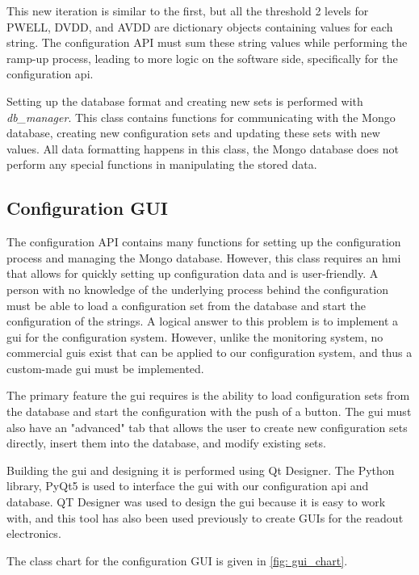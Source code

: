 \documentclass[main.tex]{subfiles}
\begin{document}
This new iteration is similar to the first, but all the threshold 2 levels for PWELL, DVDD, and AVDD are dictionary objects containing values for each string. The configuration API must sum these string values while performing the ramp-up process, leading to more logic on the software side, specifically for the configuration \gls{api}.

Setting up the database format and creating new sets is performed with  \textit{db\_manager}. This class contains functions for communicating with the Mongo database, creating new configuration sets and updating these sets with new values. All data formatting happens in this class, the Mongo database does not perform any special functions in manipulating the stored data.



\subsection{Configuration GUI}  
\label{ssec: cgui}
The configuration API contains many functions for setting up the configuration process and managing the Mongo database. However, this class requires an \gls{hmi} that allows for quickly setting up configuration data and is user-friendly. A person with no knowledge of the underlying process behind the configuration must be able to load a configuration set from the database and start the configuration of the strings. A logical answer to this problem is to implement a \gls{gui} for the configuration system. However, unlike the monitoring system, no commercial \gls{gui}s exist that can be applied to our configuration system, and thus a custom-made \gls{gui} must be implemented.

The primary feature the \gls{gui} requires is the ability to load configuration sets from the database and start the configuration with the push of a button. The \gls{gui} must also have an "advanced" tab that allows the user to create new configuration sets directly, insert them into the database, and modify existing sets.

Building the \gls{gui} and designing it is performed using Qt Designer. The Python library, PyQt5 is used to interface the \gls{gui} with our configuration \gls{api} and database. QT Designer was used to design the \gls{gui} because it is easy to work with, and this tool has also been used previously to create GUIs for the readout electronics.


The class chart for the configuration GUI is given in \autoref{fig: gui_chart}.
\end{document}
